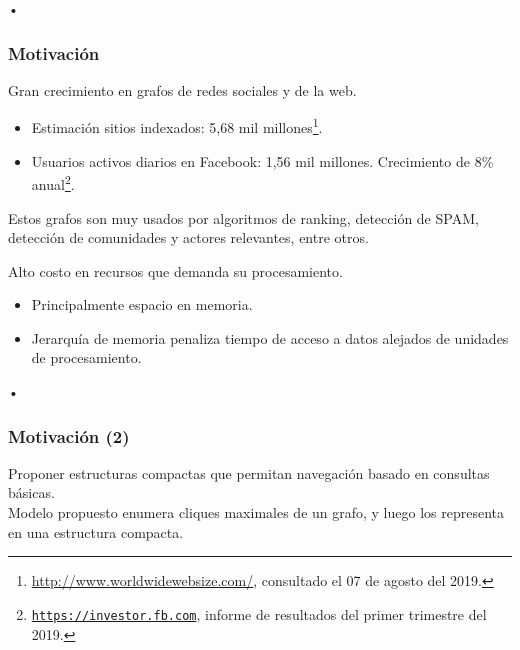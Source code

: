 \begin{frame}{•}
\frametitle{Motivación}

Gran crecimiento en grafos de redes sociales y de la web.
\begin{itemize}
	\item Estimación sitios indexados: 5,68 mil millones\footnote{\url{http://www.worldwidewebsize.com/}, consultado el 07 de agosto del 2019.}.
	\item Usuarios activos diarios en Facebook: 1,56 mil millones. Crecimiento de 8\% anual\footnote{\href{https://investor.fb.com/investor-news/press-release-details/2019/Facebook-Reports-First-Quarter-2019-Results/default.aspx}{\texttt{https://investor.fb.com}}, informe de resultados del primer trimestre del 2019.}.
\end{itemize}

Estos grafos son muy usados por algoritmos de ranking, detección de SPAM, detección de comunidades y actores relevantes, entre otros.

Alto costo en recursos que demanda su procesamiento.
\begin{itemize}
	\item Principalmente espacio en memoria.
	\item Jerarquía de memoria penaliza tiempo de acceso a datos alejados de unidades de procesamiento.
\end{itemize}

\end{frame}

\begin{frame}{•}
\frametitle{Motivación (2)}

Proponer estructuras compactas que permitan navegación basado en consultas básicas.
\\

Modelo propuesto enumera cliques maximales de un grafo, y luego los representa en una estructura compacta.
\end{frame}
